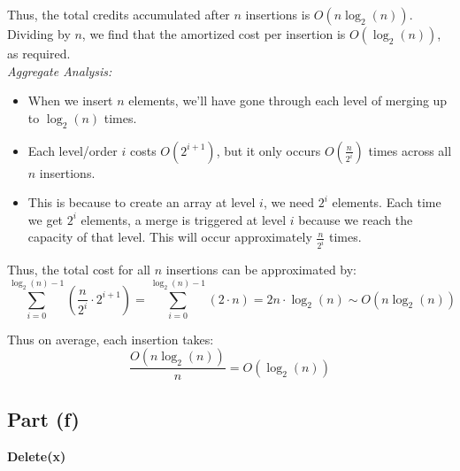 \documentclass{article}
\begin{document}
Thus, the total credits accumulated after \( n \) insertions is \( O(n \log_2(n)) \). Dividing by \( n \), we find that the amortized cost per insertion is \( O(\log_2(n)) \), as required. \\

\textit{Aggregate Analysis:}
\begin{itemize}
    \item When we insert $n$ elements, we’ll have gone through each level of merging up to $\log_2(n)$ times.
    \item Each level/order $i$ costs $O(2^{i+1})$, but it only occurs $O(\frac{n}{2^i})$ times across all $n$ insertions.
    \item This is because to create an array at level $i$, we need $2^i$ elements. Each time we get $2^i$ elements, a merge is triggered at level $i$ because we reach the capacity of that level. This will occur approximately $\frac{n}{2^i}$ times.
\end{itemize}

Thus, the total cost for all $n$ insertions can be approximated by:
\[
\sum_{i=0}^{\log_2(n) - 1} \left(\frac{n}{2^i} \cdot 2^{i+1}\right)
= \sum_{i=0}^{\log_2(n) - 1} (2 \cdot n)
= 2n \cdot \log_2(n) \sim O(n \log_2(n))
\]

Thus on average, each insertion takes:
\[
\frac{O(n \log_2(n))}{n} = O(\log_2(n))
\]

\subsection*{Part (f)}
\textbf{Delete(x)}
\end{document}
